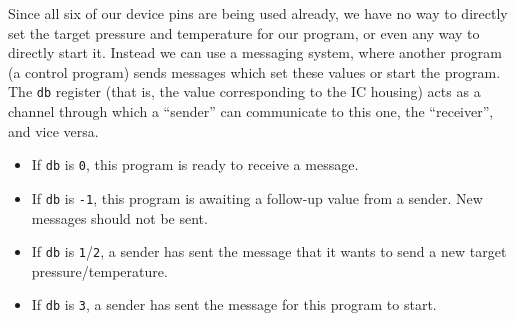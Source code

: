 \documentclass{article}
\begin{document}
Since all six of our device pins are being used already, we have no way
to directly set the target pressure and temperature for our program,
or even any way to directly start it.
Instead we can use a messaging system, where another program (a control program)
sends messages which set these values or start the program.
The \verb+db+ register (that is, the value corresponding to the IC housing)
acts as a channel through which a ``sender'' can communicate to this one,
the ``receiver'', and vice versa.
\begin{itemize}
    \item If \verb+db+ is \verb+0+, this program is ready to receive a message.
    \item If \verb+db+ is \verb+-1+, this program is awaiting a follow-up value
        from a sender. New messages should not be sent.
    \item If \verb+db+ is \verb+1+/\verb+2+, a sender has sent the message that
        it wants to send a new target pressure/temperature.
    \item If \verb+db+ is \verb+3+, a sender has sent the message for this
        program to start.
\end{itemize}
\end{document}
